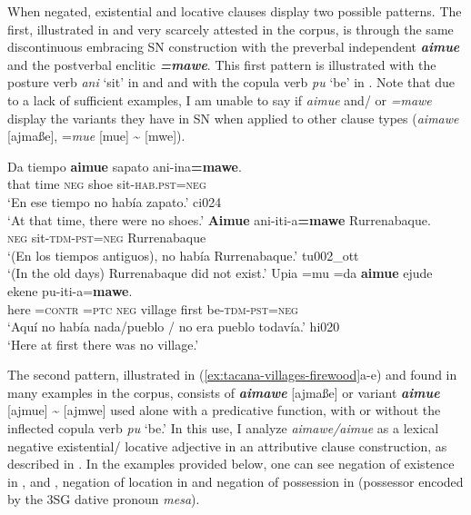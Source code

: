 \documentclass[output=paper]{langsci/langscibook}
\begin{document}
When negated, existential and locative clauses display two possible
patterns. The first, illustrated in  and very
scarcely attested in the corpus, is through the same discontinuous
embracing SN construction with the preverbal independent
\textbf{\textit{aimue}} and the postverbal enclitic
\textbf{\textit{=mawe}}. This first pattern is illustrated with the posture
verb \textit{ani} `sit' in  and
 and with the copula verb \textit{pu}
`be' in . Note that due to a
lack of sufficient examples, I am unable to say if \textit{aimue} and\slash
or \textit{=mawe} display the variants they have in SN when applied to
other clause types (\textit{aimawe} [ajmaße], =\textit{mue} [mue] 
{\textasciitilde} [mwe]).

\begin{exe}\ex\label{ex:tacana-oldtimes}\begin{xlist}
\ex\label{ex:tacana-oldtimes-noshoes}
\gll {\ob}Da tiempo{\cb} \textbf{aimue} sapato
ani-ina\textbf{=mawe}.\\
    that  time  \textsc{neg}  shoe  sit-\textsc{hab.pst=neg}\\
\glt `En ese tiempo no había zapato.' ci024\\
`At that time, there were no shoes.'
\ex\label{ex:tacana-oldtimes-Rurrenabaque}
\gll \textbf{Aimue} ani-iti-a\textbf{=mawe} Rurrenabaque.\\
    \textsc{neg}  sit-\textsc{tdm-pst=neg}  Rurrenabaque\\
\glt `(En los tiempos antiguos), no había Rurrenabaque.' tu002\_ott\\
`(In the old days) Rurrenabaque did not exist.'
\ex\label{ex:tacana-oldtimes-village}
\gll {}Upia  =mu  =da \textbf{aimue} ejude ekene
pu-iti-a=\textbf{mawe}.\\
    here  =\textsc{contr}  \textsc{=ptc}  \textsc{neg}  village  first
    be-\textsc{tdm}-\textsc{pst=neg}\\
\glt `Aquí no había nada/pueblo \slash{}  no era pueblo todavía.' hi020\\
`Here at first there was no village.'
\end{xlist}\end{exe}

The second pattern, illustrated in (\ref{ex:tacana-villages-firewood}a-e)
and found in many examples in the corpus, consists of
\textbf{\textit{aimawe}} [ajmaße] or variant \textbf{\textit{aimue}}
[ajmue] {\textasciitilde} [ajmwe] used alone with a predicative function,
with or without the inflected copula verb \textit{pu} `be.' In this use, I
analyze \textit{aimawe\slash aimue} as a lexical negative existential\slash
locative adjective in an attributive clause construction, as described in
. In the examples provided below, one can see
negation of existence in ,  and , negation of location in
 and negation of possession in  (possessor encoded by the 3SG dative pronoun \textit{mesa}).
\end{document}
